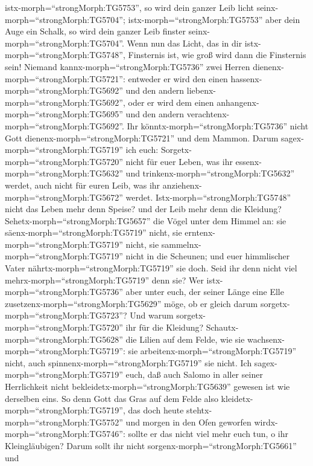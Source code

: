 istx-morph=``strongMorph:TG5753'', so wird dein ganzer Leib licht
seinx-morph=``strongMorph:TG5704''; 
istx-morph=``strongMorph:TG5753'' aber dein Auge ein Schalk, so wird
dein ganzer Leib finster seinx-morph=``strongMorph:TG5704''. Wenn nun
das Licht, das in dir istx-morph=``strongMorph:TG5748'', Finsternis ist,
wie groß wird dann die Finsternis sein!  Niemand
kannx-morph=``strongMorph:TG5736'' zwei Herren
dienenx-morph=``strongMorph:TG5721'': entweder er wird den einen
hassenx-morph=``strongMorph:TG5692'' und den andern
liebenx-morph=``strongMorph:TG5692'', oder er wird dem einen
anhangenx-morph=``strongMorph:TG5695'' und den andern
verachtenx-morph=``strongMorph:TG5692''. Ihr
könntx-morph=``strongMorph:TG5736'' nicht Gott
dienenx-morph=``strongMorph:TG5721'' und dem Mammon.  Darum
sagex-morph=``strongMorph:TG5719'' ich euch:
Sorgetx-morph=``strongMorph:TG5720'' nicht für euer Leben, was ihr
essenx-morph=``strongMorph:TG5632'' und
trinkenx-morph=``strongMorph:TG5632'' werdet, auch nicht für euren Leib,
was ihr anziehenx-morph=``strongMorph:TG5672'' werdet.
Istx-morph=``strongMorph:TG5748'' nicht das Leben mehr denn Speise? und
der Leib mehr denn die Kleidung? 
Sehetx-morph=``strongMorph:TG5657'' die Vögel unter dem Himmel an: sie
säenx-morph=``strongMorph:TG5719'' nicht, sie
erntenx-morph=``strongMorph:TG5719'' nicht, sie
sammelnx-morph=``strongMorph:TG5719'' nicht in die Scheunen; und euer
himmlischer Vater nährtx-morph=``strongMorph:TG5719'' sie doch. Seid ihr
denn nicht viel mehrx-morph=``strongMorph:TG5719'' denn sie?
 Wer istx-morph=``strongMorph:TG5736'' aber unter euch, der
seiner Länge eine Elle zusetzenx-morph=``strongMorph:TG5629'' möge, ob
er gleich darum sorgetx-morph=``strongMorph:TG5723''?  Und
warum sorgetx-morph=``strongMorph:TG5720'' ihr für die Kleidung?
Schautx-morph=``strongMorph:TG5628'' die Lilien auf dem Felde, wie sie
wachsenx-morph=``strongMorph:TG5719'': sie
arbeitenx-morph=``strongMorph:TG5719'' nicht, auch
spinnenx-morph=``strongMorph:TG5719'' sie nicht.  Ich
sagex-morph=``strongMorph:TG5719'' euch, daß auch Salomo in aller seiner
Herrlichkeit nicht bekleidetx-morph=``strongMorph:TG5639'' gewesen ist
wie derselben eins.  So denn Gott das Gras auf dem Felde
also kleidetx-morph=``strongMorph:TG5719'', das doch heute
stehtx-morph=``strongMorph:TG5752'' und morgen in den Ofen geworfen
wirdx-morph=``strongMorph:TG5746'': sollte er das nicht viel mehr euch
tun, o ihr Kleingläubigen?  Darum sollt ihr nicht
sorgenx-morph=``strongMorph:TG5661'' und
